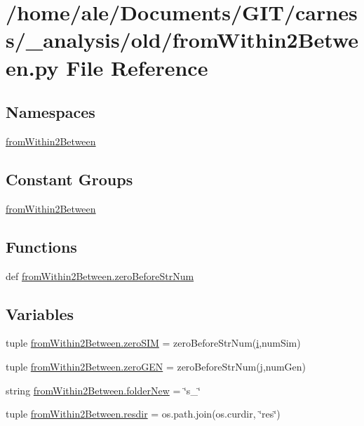 \hypertarget{a00020}{\section{/home/ale/\-Documents/\-G\-I\-T/carness/\-\_\-analysis/old/from\-Within2\-Between.py File Reference}
\label{a00020}
}
\subsection*{Namespaces}
\begin{DoxyCompactItemize}
\item 
\hyperlink{a00100}{from\-Within2\-Between}
\end{DoxyCompactItemize}
\subsection*{Constant Groups}
\begin{DoxyCompactItemize}
\item 
\hyperlink{a00100}{from\-Within2\-Between}
\end{DoxyCompactItemize}
\subsection*{Functions}
\begin{DoxyCompactItemize}
\item 
def \hyperlink{a00100_a6f865e0e97da35920db45f5491a1300f}{from\-Within2\-Between.\-zero\-Before\-Str\-Num}
\end{DoxyCompactItemize}
\subsection*{Variables}
\begin{DoxyCompactItemize}
\item 
tuple \hyperlink{a00100_a0f4d3ac33db22359da335b2db8cece7f}{from\-Within2\-Between.\-zero\-S\-I\-M} = zero\-Before\-Str\-Num(\hyperlink{a00065_ad3efca1ea6e3333daf30719ee0501862}{i},num\-Sim)
\item 
tuple \hyperlink{a00100_a1cd31aebf09d421ec4c6ef89fa122662}{from\-Within2\-Between.\-zero\-G\-E\-N} = zero\-Before\-Str\-Num(\hyperlink{a00062_ac86694252f8dfdb19aaeadc4b7c342c6}{j},num\-Gen)
\item 
string \hyperlink{a00100_abe0ecb557a225c5832c6567139bf91b4}{from\-Within2\-Between.\-folder\-New} = \char`\"{}s\-\_\-\char`\"{}
\item 
tuple \hyperlink{a00100_a47de7eeb1d8dcbb763d1f9db53fe958f}{from\-Within2\-Between.\-resdir} = os.\-path.\-join(os.\-curdir, \char`\"{}res\char`\"{})
\end{DoxyCompactItemize}
